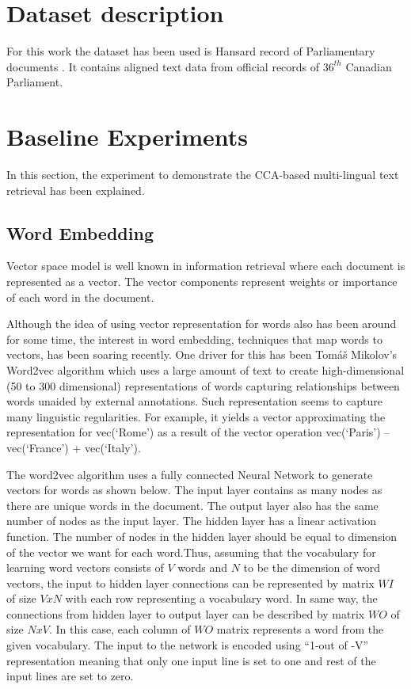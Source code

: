 \documentclass{article} %
\begin{document}
	
	\section{Dataset description}
	\label{dataset}
	For this work the dataset has been used is Hansard record of Parliamentary documents \cite{datalink}. It contains aligned text data from official records of $36^{th}$ Canadian Parliament. 
	
	
	\section{Baseline Experiments}
	\label{experiment}
	
	In this section, the experiment to demonstrate the CCA-based multi-lingual text retrieval has been explained.
	\subsection{Word Embedding}
	Vector space model is well known in information retrieval where each document is represented as a vector. The vector components represent weights or importance of each word in the document.
	
	Although the idea of using vector representation for words also has been around for some time, the interest in word embedding, techniques that map words to vectors, has been soaring recently. One driver for this has been Tomáš Mikolov’s Word2vec algorithm which uses a large amount of text to create high-dimensional (50 to 300 dimensional) representations of words capturing relationships between words unaided by external annotations. Such representation seems to capture many linguistic regularities. For example, it yields a vector approximating the representation for vec(‘Rome’) as a result of the vector operation vec(‘Paris’) – vec(‘France’) + vec(‘Italy’).
	
	The word2vec algorithm uses a fully connected Neural Network to generate vectors for words as shown below. The input layer contains as many nodes as there are unique words in the document. The output layer also has the same number of nodes as the input layer. The hidden layer has a linear activation function. The number of nodes in the hidden layer should be equal to dimension of the vector we want for each word.Thus, assuming that the vocabulary for learning word vectors consists of $V$ words and $N$ to be the dimension of word vectors, the input to hidden layer connections can be represented by matrix $WI$ of size $VxN$ with each row representing a vocabulary word. In same way, the connections from hidden layer to output layer can be described by matrix $WO$ of size $NxV$. In this case, each column of $WO$ matrix represents a word from the given vocabulary. The input to the network is encoded using “1-out of -V” representation meaning that only one input line is set to one and rest of the input lines are set to zero.
	
\end{document}
